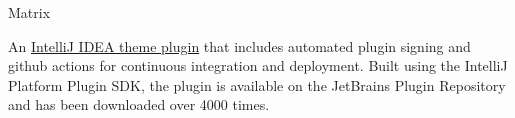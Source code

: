 \cventry
    {Matrix} %
    {} %
    {} %
    {} %
    {\begin{cvitems}
        \item{An \href{https://plugins.jetbrains.com/plugin/23426-matrix}{IntelliJ IDEA theme plugin} that includes automated plugin signing and github actions for
        continuous integration and deployment. Built using the IntelliJ Platform Plugin SDK, the plugin is available
        on the JetBrains Plugin Repository and has been downloaded over 4000 times.}
    \end{cvitems}}